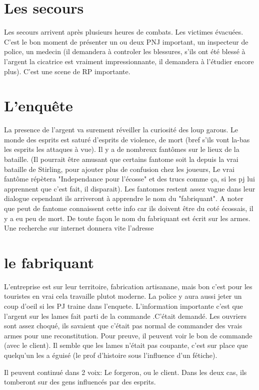 \documentclass[oneside,12pt]{book}
\begin{document}
\begin{flushleft}
\section{Les secours}
 Les secours arrivent après plusieurs heures de combats. Les victimes évacuées.
C'est le bon moment de présenter un ou deux PNJ important, un inspecteur de police, un medecin (il demandera à controler les blessures, s'ils ont été blessé à l'argent
la cicatrice est vraiment impressionnante, il demandera à l'étudier encore plus). 
C'est une scene de RP importante. 

\section{L'enquête}
La presence de l'argent va surement réveiller la curiosité des loup garous.
Le monde des esprits est saturé d'esprits de violence, de mort (bref s'ils vont la-bas les esprits les attaques à vue).
Il y a de nombreux fantômes sur le lieux de la bataille. (Il pourrait être amusant que certains fantome soit la depuis la vrai bataille de Stirling, pour ajouter
plus de confusion chez les joueurs, Le vrai fantôme répètera "Independance pour l'écosse" et des trucs comme ça, si les pj lui apprennent que c'est fait, il disparait). 
Les fantomes restent assez vague dans leur dialogue cependant ils arriveront à apprendre le nom du "fabriquant". A noter que peut de fantome connaissent cette info car ils doivent être du coté écossais, il y a eu peu de mort. De toute façon le nom du fabriquant est écrit sur les armes. Une recherche sur internet donnera vite l'adresse


\section{le fabriquant}
L'entreprise est sur leur territoire, fabrication artisanane, 
mais bon c'est pour les touristes en vrai cela travaille plutot moderne.
La police y aura aussi jeter un coup d'oeil si les PJ traine dans l'enquete. L'information importante c'est que l'argent sur les lames fait parti de la commande
.C'était demandé.
Les ouvriers sont assez choqué, ils savaient que c'était pas normal de commander des vrais armes pour une reconstitution. 
Pour preuve, il peuvent voir le bon de commande (avec le client). Il semble que les lames n'était pas coupante, c'est sur place que quelqu'un les a éguisé (le prof d'histoire sous l'influence d'un fétiche).

Il peuvent continué dans 2 voix: Le forgeron, ou le client. Dans les deux cas, ils tomberont sur des gens influencés par des esprits.


\end{flushleft}
\end{document}
